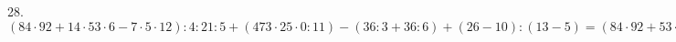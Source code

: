 28. $(84\cdot92+14\cdot53\cdot6-7\cdot5\cdot12):4:21:5+(473\cdot25\cdot0:11)-(36:3+36:6)+(26-10):(13-5)=(84\cdot92+53\cdot84-5\cdot84):(4\cdot21):5+0-(12+6)+16:8=
84\cdot(92+53-5):84:5-18+2=140:5-18+2=28-18+2=12.$\\
